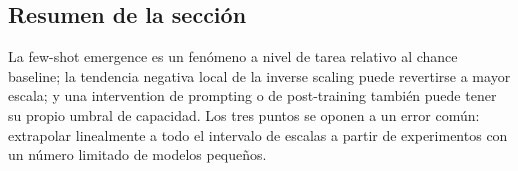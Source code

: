 \subsection{Resumen de la sección}

La few-shot emergence es un fenómeno a nivel de tarea relativo al chance baseline; la tendencia negativa local de la inverse scaling puede revertirse a mayor escala; y una intervention de prompting o de post-training también puede tener su propio umbral de capacidad. Los tres puntos se oponen a un error común: extrapolar linealmente a todo el intervalo de escalas a partir de experimentos con un número limitado de modelos pequeños.
